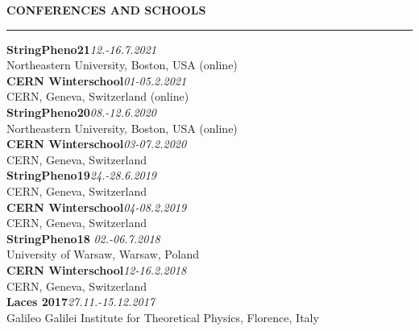 \documentclass[a4paper,12pt]{report}
\newenvironment{rSection}[1]{ %
  \sectionskip
  \MakeUppercase{\bf #1} %
  \sectionlineskip
  \hrule %
  \begin{list}{}{ %
    \setlength{\leftmargin}{1.5em} %
  }
  \item[]
}{
  \end{list}
}
\def\sectionlineskip{\medskip} %
\def\sectionskip{\medskip} %
\begin{document}
            \begin{rSection}{Conferences and Schools}
            
            {\bf StringPheno21}\hfill {\em 12.-16.7.2021}
            \\ Northeastern University, Boston, USA (online)\vspace{7pt}
            \\{\bf CERN Winterschool}\hfill {\em 01-05.2.2021}
            \\CERN, Geneva, Switzerland (online)\vspace{7pt}
            \\{\bf StringPheno20}\hfill {\em 08.-12.6.2020}
            \\ Northeastern University, Boston, USA (online)\vspace{7pt}
            \\{\bf CERN Winterschool}\hfill {\em 03-07.2.2020}
            \\CERN, Geneva, Switzerland\vspace{7pt}
            \\{\bf StringPheno19}\hfill {\em 24.-28.6.2019}
            \\ CERN, Geneva, Switzerland\vspace{7pt}
            \\{\bf CERN Winterschool}\hfill {\em 04-08.2.2019}
            \\CERN, Geneva, Switzerland\vspace{7pt}
            \\{\bf StringPheno18} \hfill {\em 02.-06.7.2018}
            \\University of Warsaw, Warsaw, Poland\vspace{7pt}
            \\{\bf CERN Winterschool}\hfill{\em 12-16.2.2018}
            \\CERN, Geneva, Switzerland \vspace{7pt}
            \\{\bf Laces 2017}\hfill{\em 27.11.-15.12.2017}
            \\Galileo Galilei Institute for Theoretical Physics, Florence, Italy
            
            \end{rSection}
            
\end{document}
